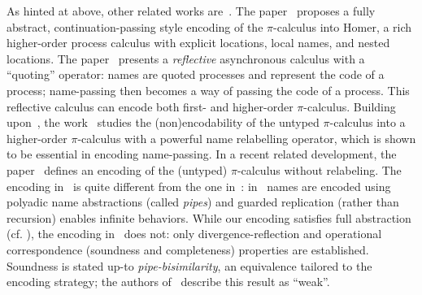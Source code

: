 As hinted at above, other related works are~\cite{BundgaardHG06,DBLP:journals/entcs/MeredithR05,XuActa2012,DBLP:journals/iandc/LanesePSS11}.
The paper~\cite{BundgaardHG06} proposes a fully abstract, contin\-u\-a\-tion-passing style encoding of the 
$\pi$-calculus into Homer, a rich higher-order process calculus with explicit locations, local names, and nested locations.
The paper~\cite{DBLP:journals/entcs/MeredithR05}
presents a \emph{reflective} asynchronous calculus with a ``quoting'' operator: names are quoted processes and represent the code 
of a process; name-passing then becomes a way of passing the code of a process. This reflective calculus 
can encode both first- and higher-order $\pi$-calculus.
Building upon~\cite{ThomsenB:plachoasgcfhop},
the work~\cite{XuActa2012} studies 
the (non)en\-co\-da\-bi\-lity of the untyped $\pi$-calculus into 
a higher-order $\pi$-calculus with a powerful 
name relabelling operator, which is 
shown to be essential in encoding name-passing. 
In a recent related development, the paper~\cite{DBLP:journals/corr/XuYL15} defines an encoding of the (untyped) $\pi$-calculus 
without relabeling. 
The encoding in~\cite{DBLP:journals/corr/XuYL15} is quite different from the one in~:
in~\cite{DBLP:journals/corr/XuYL15} names are encoded using polyadic name abstractions (called \emph{pipes}) and 
guarded replication (rather than recursion) enables infinite behaviors.
While our encoding satisfies full abstraction (cf. ), 
the encoding in~\cite{DBLP:journals/corr/XuYL15} does not: only 
divergence-reflection
and 
operational correspondence (soundness and completeness) properties 
are established.
Soundness is stated up-to \emph{pipe-bisimilarity}, an equivalence tailored to the encoding strategy;
the authors of~\cite{DBLP:journals/corr/XuYL15} describe this result as ``weak''.


